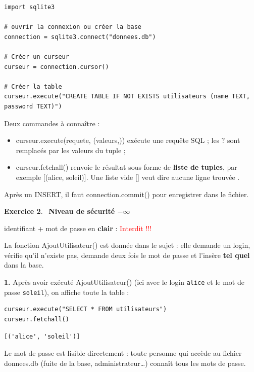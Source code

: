 \documentclass[11pt,a4paper]{article}
\newcommand{\code}[1]{\colorbox{fondcode}{\ttfamily\small #1}}
\newcommand{\q}{\textquotesingle}
\newcommand{\exo}[1]{\par\medskip\textbf{Exercice #1}.\ }
\begin{document}
\begin{lstlisting}
import sqlite3

# ouvrir la connexion ou créer la base
connection = sqlite3.connect("donnees.db")

# Créer un curseur
curseur = connection.cursor()

# Créer la table
curseur.execute("CREATE TABLE IF NOT EXISTS utilisateurs (name TEXT, password TEXT)")
\end{lstlisting}

Deux commandes à connaître :
\begin{itemize}
  \item \code{curseur.execute(requete, (valeurs,))} exécute une requête SQL ; les \code{?} sont remplacés par les valeurs du tuple ;
  \item \code{curseur.fetchall()} renvoie le résultat sous forme de \textbf{liste de tuples}, par exemple \code{[(\q{}alice\q{}, \q{}soleil\q{})]}. Une liste vide \code{[]} veut dire \og aucune ligne trouvée \fg{}.
\end{itemize}
Après un \code{INSERT}, il faut \code{connection.commit()} pour enregistrer dans le fichier.

\exo{2} \textbf{Niveau de sécurité $-\infty$}

\begin{rappel}[Cours]
identifiant + mot de passe en \textbf{clair} : \textcolor{red}{Interdit !!!}
\end{rappel}

La fonction \code{AjoutUtilisateur()} est donnée dans le sujet : elle demande un login, vérifie qu'il n'existe pas, demande deux fois le mot de passe et l'insère \textbf{tel quel} dans la base.

\textbf{1.} Après avoir exécuté \code{AjoutUtilisateur()} (ici avec le login \texttt{alice} et le mot de passe \texttt{soleil}), on affiche toute la table :

\begin{lstlisting}
curseur.execute("SELECT * FROM utilisateurs")
curseur.fetchall()
\end{lstlisting}

\begin{lstlisting}[style=sortie]
[('alice', 'soleil')]
\end{lstlisting}

Le mot de passe est lisible directement : toute personne qui accède au fichier \code{donnees.db} (fuite de la base, administrateur\dots) connaît tous les mots de passe.
\end{document}
